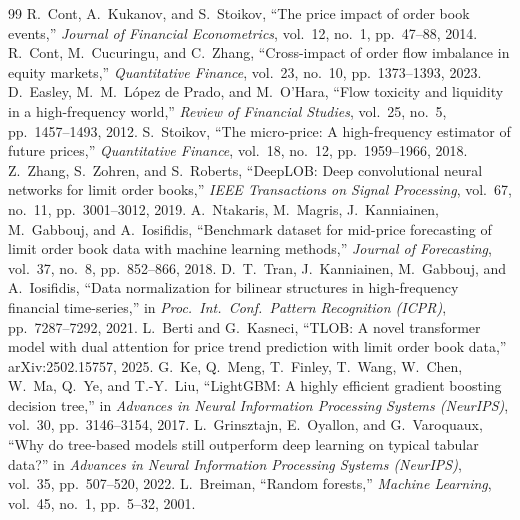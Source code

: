 \documentclass[12pt,a4paper,oneside]{report}
\begin{document}
\renewcommand{\bibname}{References}
\cleardoublepage{}
\begin{thebibliography}{99}
 R.~Cont, A.~Kukanov, and S.~Stoikov, ``The price impact of order book events,'' \emph{Journal of Financial Econometrics}, vol.~12, no.~1, pp.~47--88, 2014.
 R.~Cont, M.~Cucuringu, and C.~Zhang, ``Cross-impact of order flow imbalance in equity markets,'' \emph{Quantitative Finance}, vol.~23, no.~10, pp.~1373--1393, 2023.
 D.~Easley, M.~M.~L\'opez de Prado, and M.~O'Hara, ``Flow toxicity and liquidity in a high-frequency world,'' \emph{Review of Financial Studies}, vol.~25, no.~5, pp.~1457--1493, 2012.
 S.~Stoikov, ``The micro-price: A high-frequency estimator of future prices,'' \emph{Quantitative Finance}, vol.~18, no.~12, pp.~1959--1966, 2018.
 Z.~Zhang, S.~Zohren, and S.~Roberts, ``DeepLOB: Deep convolutional neural networks for limit order books,'' \emph{IEEE Transactions on Signal Processing}, vol.~67, no.~11, pp.~3001--3012, 2019.
 A.~Ntakaris, M.~Magris, J.~Kanniainen, M.~Gabbouj, and A.~Iosifidis, ``Benchmark dataset for mid-price forecasting of limit order book data with machine learning methods,'' \emph{Journal of Forecasting}, vol.~37, no.~8, pp.~852--866, 2018.
 D.~T.~Tran, J.~Kanniainen, M.~Gabbouj, and A.~Iosifidis, ``Data normalization for bilinear structures in high-frequency financial time-series,'' in \emph{Proc.\ Int.\ Conf.\ Pattern Recognition (ICPR)}, pp.~7287--7292, 2021.
 L.~Berti and G.~Kasneci, ``TLOB: A novel transformer model with dual attention for price trend prediction with limit order book data,'' arXiv:2502.15757, 2025.
 G.~Ke, Q.~Meng, T.~Finley, T.~Wang, W.~Chen, W.~Ma, Q.~Ye, and T.-Y.~Liu, ``LightGBM: A highly efficient gradient boosting decision tree,'' in \emph{Advances in Neural Information Processing Systems (NeurIPS)}, vol.~30, pp.~3146--3154, 2017.
 L.~Grinsztajn, E.~Oyallon, and G.~Varoquaux, ``Why do tree-based models still outperform deep learning on typical tabular data?'' in \emph{Advances in Neural Information Processing Systems (NeurIPS)}, vol.~35, pp.~507--520, 2022.
 L.~Breiman, ``Random forests,'' \emph{Machine Learning}, vol.~45, no.~1, pp.~5--32, 2001.

\end{thebibliography}
\end{document}
